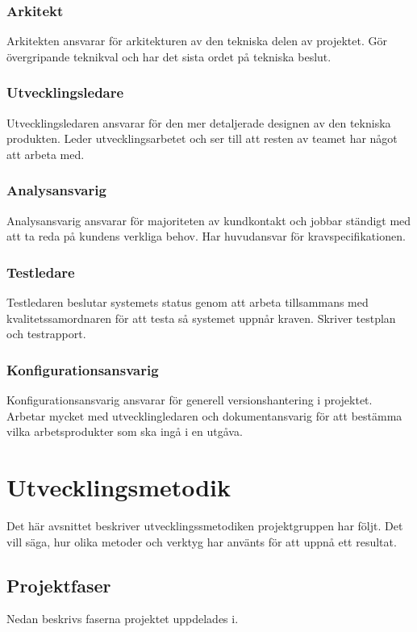 \subsubsection*{Arkitekt}
Arkitekten ansvarar för arkitekturen av den tekniska delen av projektet. Gör övergripande teknikval och har det sista ordet på tekniska beslut.

\subsubsection*{Utvecklingsledare}
Utvecklingsledaren ansvarar för den mer detaljerade designen av den tekniska produkten. Leder utvecklingsarbetet och ser till att resten av teamet har något att arbeta med.

\subsubsection*{Analysansvarig}
Analysansvarig ansvarar för majoriteten av kundkontakt och jobbar ständigt med att ta reda på kundens verkliga behov. Har huvudansvar för kravspecifikationen.

\subsubsection*{Testledare}
Testledaren beslutar systemets status genom att arbeta tillsammans med kvalitetssamordnaren för att testa så systemet uppnår kraven. Skriver testplan och testrapport.

\subsubsection*{Konfigurationsansvarig}
Konfigurationsansvarig ansvarar för generell versionshantering i projektet. Arbetar mycket med utvecklingledaren och dokumentansvarig för att bestämma vilka arbetsprodukter som ska ingå i en utgåva.

\section{Utvecklingsmetodik}
Det här avsnittet beskriver utvecklingssmetodiken projektgruppen har följt. Det  vill säga, hur olika metoder och verktyg har använts för att uppnå ett resultat.

\subsection{Projektfaser}
Nedan beskrivs faserna projektet uppdelades i. 

